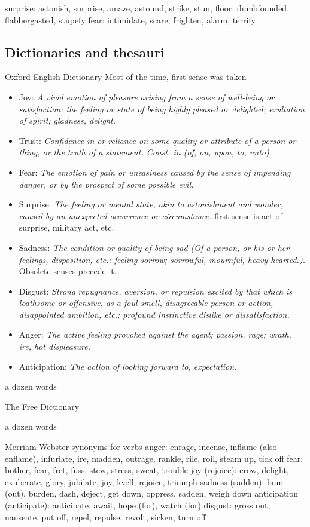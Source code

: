 surprise: astonish, surprise, amaze, astound, strike, stun, floor, dumbfounded, flabbergasted, stupefy
fear: intimidate, scare, frighten, alarm, terrify



\subsection{Dictionaries and thesauri}

Oxford English Dictionary
Most of the time, first sense was taken
\begin{itemize}
	\item Joy: \textit{A vivid emotion of pleasure arising from a sense of well-being or satisfaction; the feeling or state of being highly pleased or delighted; exultation of spirit; gladness, delight.}
	\item Trust: \textit{Confidence in or reliance on some quality or attribute of a person or thing, or the truth of a statement. Const. in (of, on, upon, to, unto).}
	\item Fear: \textit{The emotion of pain or uneasiness caused by the sense of impending danger, or by the prospect of some possible evil.}
	\item Surprise: \textit{The feeling or mental state, akin to astonishment and wonder, caused by an unexpected occurrence or circumstance.} first sense is act of surprise, military act, etc.
	\item Sadness: \textit{The condition or quality of being sad (Of a person, or his or her feelings, disposition, etc.: feeling sorrow; sorrowful, mournful, heavy-hearted.).} Obsolete senses precede it.
	\item Disgust: \textit{Strong repugnance, aversion, or repulsion excited by that which is loathsome or offensive, as a foul smell, disagreeable person or action, disappointed ambition, etc.; profound instinctive dislike or dissatisfaction.}
	\item Anger: \textit{The active feeling provoked against the agent; passion, rage; wrath, ire, hot displeasure.}
	\item Anticipation: \textit{The action of looking forward to, expectation.}
\end{itemize}
a dozen words

The Free Dictionary

a dozen words

Merriam-Webster
synonyms for verbs 
anger: enrage, incense, inflame (also enflame), infuriate, ire, madden, outrage, rankle, rile, roil, steam up, tick off
fear: bother, fear, fret, fuss, stew, stress, sweat, trouble
joy (rejoice): crow, delight, exuberate, glory, jubilate, joy, kvell, rejoice, triumph
sadness (sadden): bum (out), burden, dash, deject, get down, oppress, sadden, weigh down
anticipation (anticipate): anticipate, await, hope (for), watch (for)
disgust: gross out, nauseate, put off, repel, repulse, revolt, sicken, turn off



